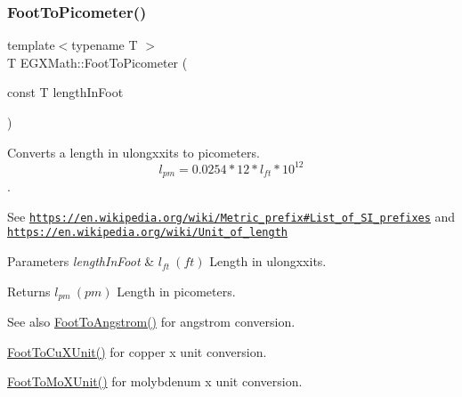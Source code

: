 \subsubsection{\texorpdfstring{Foot\+To\+Picometer()}{FootToPicometer()}}
{\footnotesize\ttfamily template$<$typename T $>$ \\
T E\+G\+X\+Math\+::\+Foot\+To\+Picometer (\begin{DoxyParamCaption}\item[{const T}]{length\+In\+Foot }\end{DoxyParamCaption})}



Converts a length in ulongxxits to picometers. \[ l_{pm}=0.0254 * 12 * l_{ft} * 10^{12} \]. 

See \href{https://en.wikipedia.org/wiki/Metric_prefix#List_of_SI_prefixes}{\tt https\+://en.\+wikipedia.\+org/wiki/\+Metric\+\_\+prefix\#\+List\+\_\+of\+\_\+\+S\+I\+\_\+prefixes} and \href{https://en.wikipedia.org/wiki/Unit_of_length}{\tt https\+://en.\+wikipedia.\+org/wiki/\+Unit\+\_\+of\+\_\+length} 
\begin{DoxyParams}{Parameters}
{\em length\+In\+Foot} & $ l_{ft}\ (ft)$ Length in ulongxxits. \\
\hline
\end{DoxyParams}
\begin{DoxyReturn}{Returns}
$ l_{pm}\ (pm)$ Length in picometers. 
\end{DoxyReturn}
\begin{DoxySeeAlso}{See also}
\mbox{\hyperlink{group___e_g_x_math-_conversions-_length_conversions-_imperial-_foot-_non-_s_i_ga39b1712b38ad7c61cb859376f07decda}{Foot\+To\+Angstrom()}} for angstrom conversion. 

\mbox{\hyperlink{group___e_g_x_math-_conversions-_length_conversions-_imperial-_foot-_non-_s_i_ga965e1b5a43bec32129d8319540036be1}{Foot\+To\+Cu\+X\+Unit()}} for copper x unit conversion. 

\mbox{\hyperlink{group___e_g_x_math-_conversions-_length_conversions-_imperial-_foot-_non-_s_i_ga06bc5f701660697593ed1aacd4abd3d6}{Foot\+To\+Mo\+X\+Unit()}} for molybdenum x unit conversion. 
\end{DoxySeeAlso}
\mbox{\label{group___e_g_x_math-_conversions-_length_conversions-_imperial-_foot-_s_i_ga5ef1947187e98d3000e3c1eb836df0af}} 
